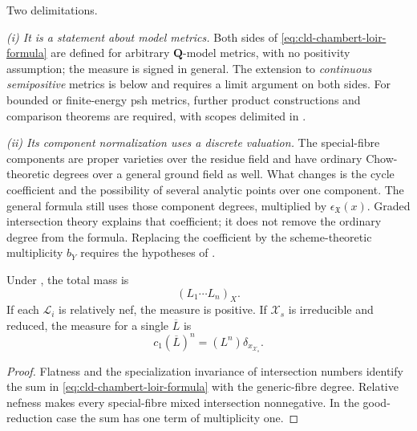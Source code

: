 \begin{remark}
\label{rem:ch17-cl-scope}
Two delimitations.

\emph{(i) It is a statement about model metrics.}  Both sides of
\eqref{eq:cld-chambert-loir-formula} are defined for arbitrary
$\mathbf Q$-model metrics, with no positivity assumption; the measure is
signed in general.  The extension to \emph{continuous semipositive} metrics
is  below and requires a limit argument on both
sides.  For bounded or finite-energy psh metrics, further product constructions
and comparison theorems are required, with scopes delimited in .

\emph{(ii) Its component normalization uses a discrete valuation.}
The special-fibre components are proper varieties over the residue field
and have ordinary Chow-theoretic degrees over a general ground field as
well.  What changes is the cycle coefficient and the possibility of
several analytic points over one component.  The general formula
 still uses those component degrees,
multiplied by $\epsilon_{\mathfrak X}(x)$.  Graded intersection theory
explains that coefficient; it does not remove the ordinary degree from
the formula.  Replacing the coefficient by the scheme-theoretic
multiplicity $b_Y$ requires the hypotheses of
.
\end{remark}

\begin{corollary}
\label{cor:ch17-cl-mass}
Under , the total mass is
\[
                    (L_1\cdots L_n)_X.
\]
If each $\mathcal L_i$ is relatively nef, the measure is positive.  If
$\mathcal X_s$ is irreducible and reduced, the measure for a single
$\overline L$ is
\[
                         c_1(\overline L)^n=(L^n)\delta_{x_{\mathcal X_s}}.
\]
\end{corollary}
\begin{proof}
Flatness and the specialization invariance of intersection numbers identify
the sum in \eqref{eq:cld-chambert-loir-formula} with the generic-fibre
degree.  Relative nefness makes every special-fibre mixed intersection
nonnegative.  In the good-reduction case the sum has one term of
multiplicity one.
\end{proof}

